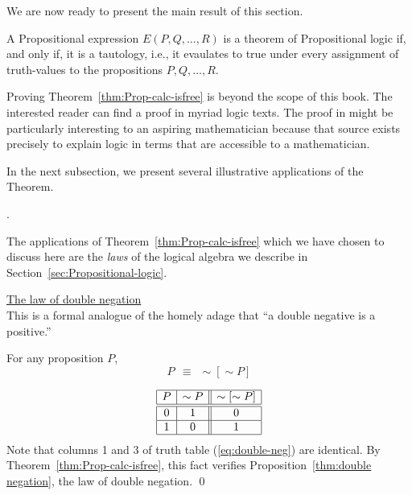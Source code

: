 We are now ready to present the main result of this section.

\begin{theorem}
\label{thm:Prop-calc-isfree}
A Propositional expression $E(P, Q, \ldots, R)$ is a theorem of
Propositional logic if, and only if, it is a tautology, i.e., it
evaulates to {\sc true} under every assignment of truth-values to the
propositions $P, Q, \ldots, R$.
\end{theorem}

Proving Theorem~\ref{thm:Prop-calc-isfree} is beyond the scope of this
book.  The interested reader can find a proof in myriad logic texts.
The proof in  \cite{Rosser53} might be particularly interesting to an
aspiring mathematician because that source exists precisely to explain
logic in terms that are accessible to a mathematician.

In the next subsection, we present several illustrative applications
of the Theorem.


\bigskip

.

The applications of Theorem~\ref{thm:Prop-calc-isfree} which we have
chosen to discuss here are the {\em laws} of the logical algebra we
describe in Section~\ref{sec:Propositional-logic}.

\bigskip

\noindent
\underline{\small\sf The law of double negation} \\
This is a formal analogue of the homely adage that ``a double negative
is a positive.''

\begin{prop}
\label{thm:double negation}
For any proposition $P$,
\[ P \ \ \equiv \ \ \sim [\sim P] \]
\end{prop}

\begin{equation}
\label{eq:double-neg}
\begin{array}{|c|c||c|}
\hline
P & \sim P & \sim[\sim P] \\
\hline
\hline
0 & 1 & 0 \\
\hline
1 & 0 & 1 \\
\hline
\end{array}
\end{equation}
Note that columns 1 and 3 of truth table (\ref{eq:double-neg}) are
identical.  By Theorem~\ref{thm:Prop-calc-isfree}, this fact verifies
Proposition~\ref{thm:double negation}, the law of double negation.
\qed

